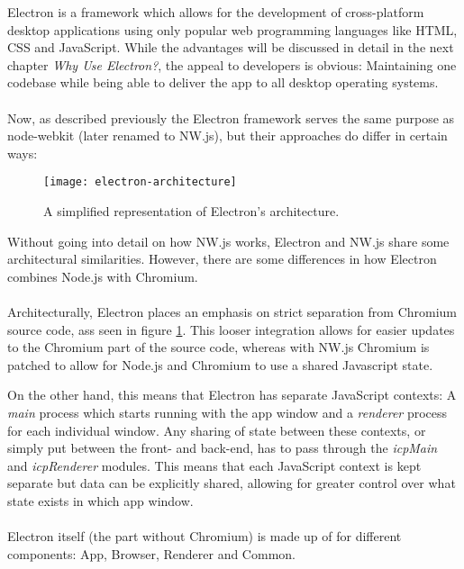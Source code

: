Electron is a framework which allows for the development of cross-platform desktop applications using only popular 
web programming languages like HTML, CSS and JavaScript. 
While the advantages will be discussed in detail in the next chapter \emph{Why Use Electron?}, the appeal to developers
is obvious: Maintaining one codebase while being able to deliver the app to all desktop operating systems.\paragraph{}
Now, as described previously the Electron framework serves the same purpose as node-webkit (later renamed to NW.js), but
their approaches do differ in certain ways: \parencite{jensen2017}\par
\begin{figure}[ht]
    \texttt{[image: electron-architecture]}
    \caption{A simplified representation of Electron's architecture. \parencite{jensen2017}}
    \label{fig:el-architecture}
\end{figure}
Without going into detail on how NW.js works, Electron and NW.js share some architectural similarities.
However, there are some differences in how Electron combines Node.js with Chromium.\paragraph{}
Architecturally, Electron places an emphasis on strict separation from Chromium source code, ass seen in figure \ref{fig:el-architecture}.
This looser integration allows for easier updates to the Chromium part of the source code, whereas with NW.js Chromium
is patched to allow for Node.js and Chromium to use a shared Javascript state. \parencite{jensen2017}\par
On the other hand, this means that Electron has separate JavaScript contexts: A \emph{main} process which starts running
with the app window and a \emph{renderer} process for each individual window.
Any sharing of state between these contexts, or simply put between the front- and back-end, has to pass through the
\emph{icpMain} and \emph{icpRenderer} modules.
This means that each JavaScript context is kept separate but data can be explicitly shared, allowing for greater control
over what state exists in which app window. \parencite{jensen2017}\paragraph{}
Electron itself (the part without Chromium) is made up of for different components: App, Browser, Renderer and Common.
